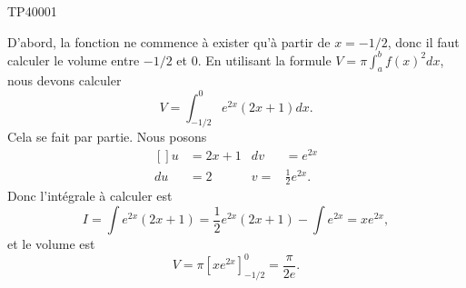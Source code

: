 \begin{corrige}{TP40001}

% 
D'abord, la fonction ne commence à exister qu'à partir de $x=-1/2$, donc il faut calculer le volume entre $-1/2$ et $0$. En utilisant la formule $V=\pi\int_a^bf(x)^2dx$, nous devons calculer
\begin{equation}
	V=\int_{-1/2}^0 e^{2x}(2x+1)dx.
\end{equation}
Cela se fait par partie. Nous posons
\begin{equation}
	\begin{aligned}[]
		u&=2x+1	&dv&= e^{2x}\\
		du&=2	&v=&\frac{1}{ 2 } e^{2x}.
	\end{aligned}
\end{equation}
Donc l'intégrale à calculer est
\begin{equation}
	I=\int e^{2x}(2x+1)=\frac{1}{ 2 } e^{2x}(2x+1)-\int  e^{2x}=x e^{2x},
\end{equation}
et le volume est
\begin{equation}
	V=\pi[x e^{2x}]_{-1/2}^0=\frac{ \pi }{ 2e }.
\end{equation}


\end{corrige}
